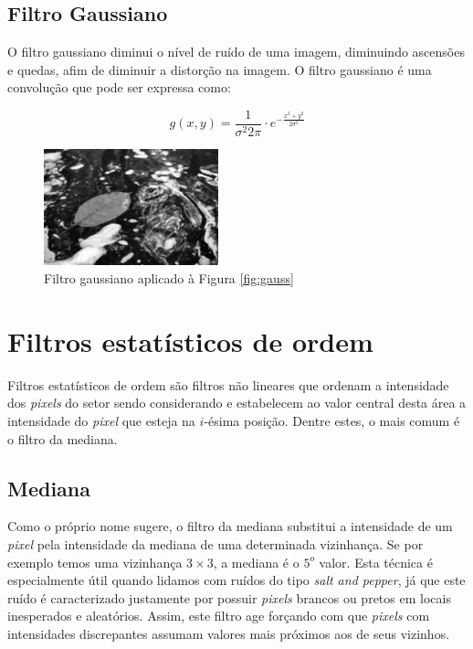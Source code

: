 \documentclass[10pt,a4paper]{article}
\newcommand{\pixel}{\textit{pixel} }
\newcommand{\pixels}{\textit{pixels} }
\begin{document}
\subsection{Filtro Gaussiano}
O filtro gaussiano diminui o nível de ruído de uma imagem, diminuindo ascensões e quedas, afim de diminuir a distorção na imagem. O filtro gaussiano é uma convolução que pode ser expressa como:

\begin{equation}
g(x,y) = \frac{1}{\sigma^{2} 2 \pi} \cdot e^{-\frac{x^2 + y^2}{2 \sigma^{2}}}
\end{equation}

\begin{figure}[!ht]
    \centering
    \includegraphics[width=0.45\textwidth]{dst_sp_median.jpg}
    \caption{Filtro gaussiano aplicado à Figura \ref{fig:gauss}}
    \label{fig:gauss_filter}
\end{figure}

\section{Filtros estatísticos de ordem}
Filtros estatísticos de ordem são filtros não lineares que ordenam a intensidade dos \pixels do setor sendo considerando e estabelecem ao valor central desta área a intensidade do \pixel que esteja na $i$-ésima posição. Dentre estes, o mais comum é o filtro da mediana.

\subsection{Mediana}
Como o próprio nome sugere, o filtro da mediana substitui a intensidade de um \pixel pela intensidade da mediana de uma determinada vizinhança. Se por exemplo temos uma vizinhança $3\times3$, a mediana é o $5^o$ valor. Esta técnica é especialmente útil quando lidamos com ruídos do tipo \textit{salt and pepper}, já que este ruído é caracterizado justamente por possuir \pixels brancos ou pretos em locais inesperados e aleatórios. Assim, este filtro age forçando com que \pixels com intensidades discrepantes assumam valores mais próximos aos de seus vizinhos.
\end{document}
